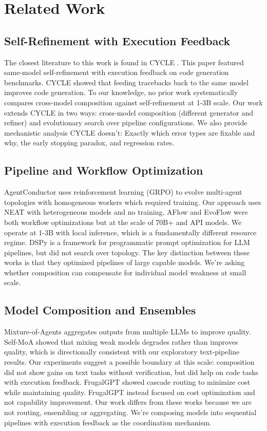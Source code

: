 \documentclass{article}
\begin{document}
\section{Related Work}
\subsection{Self-Refinement with Execution Feedback}
The closest literature to this work is found in CYCLE \cite{cycle2024}. This paper featured same-model self-refinement with execution feedback on code generation benchmarks. CYCLE showed that feeding tracebacks back to the same model improves code generation. To our knowledge, no prior work systematically compares cross-model composition against self-refinement at 1-3B scale. Our work extends CYCLE in two ways: cross-model composition (different generator and refiner) and evolutionary search over pipeline configurations. We also provide mechanistic analysis CYCLE doesn't: Exactly which error types are fixable and why, the early stopping paradox, and regression rates.

\subsection{Pipeline and Workflow Optimization}
AgentConductor \cite{agentconductor2026} uses reinforcement learning (GRPO) to evolve multi-agent topologies with homogeneous workers which required training. Our approach uses NEAT with heterogeneous models and no training. AFlow \cite{aflow2025} and EvoFlow \cite{evoflow2025} were both workflow optimizations but at the scale of 70B+ and API models. We operate at 1-3B with local inference, which is a fundamentally different resource regime. DSPy \cite{dspy2023} is a framework for programmatic prompt optimization for LLM pipelines, but did not search over topology. The key distinction between these works is that they optimized pipelines of large capable models. We're asking whether composition can compensate for individual model weakness at small scale.

\subsection{Model Composition and Ensembles}
Mixture-of-Agents \cite{moa2024} aggregates outputs from multiple LLMs to improve quality. Self-MoA \cite{selfmoa2025} showed that mixing weak models degrades rather than improves quality, which is directionally consistent with our exploratory text-pipeline results. Our experiments suggest a possible boundary at this scale: composition did not show gains on text tasks without verification, but did help on code tasks with execution feedback. FrugalGPT \cite{frugalgpt2023} showed cascade routing to minimize cost while maintaining quality. FrugalGPT instead focused on cost optimization and not capability improvement. Our work differs from these works because we are not routing, ensembling or aggregating. We're composing models into sequential pipelines with execution feedback as the coordination mechanism.
\end{document}
